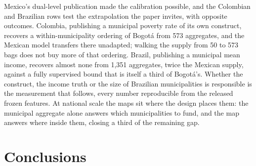 \documentclass[11pt]{article}
\begin{document}
Mexico's dual-level publication made the calibration possible, and the Colombian and
Brazilian rows test the extrapolation the paper invites, with opposite outcomes.
Colombia, publishing a municipal poverty rate of its own construct, recovers a
within-municipality ordering of Bogot\'a from 573 aggregates, and the Mexican model
transfers there unadapted; walking the supply from 50 to 573 bags does not buy more of
that ordering. Brazil, publishing a municipal mean income, recovers almost none from
1{,}351 aggregates, twice the Mexican supply, against a fully supervised bound that is
itself a third of Bogot\'a's. Whether the construct, the income truth or the size of
Brazilian municipalities is responsible is the measurement that follows, every number
reproducible from the released frozen features. At national scale the maps sit where
the design places them: the municipal aggregate alone answers which municipalities to
fund, and the map answers where inside them, closing a third of the remaining gap.

\section{Conclusions}
\end{document}
